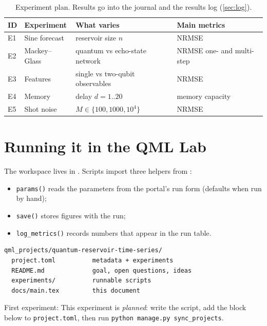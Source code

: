 \documentclass[11pt,a4paper]{article}
\begin{document}
\begin{table}[h]
\centering\small
\begin{tabularx}{\linewidth}{@{}l>{\raggedright}X>{\raggedright}X>{\raggedright\arraybackslash}X@{}}
\toprule
ID & Experiment & What varies & Main metrics \\
\midrule
  E1 & Sine forecast & reservoir size $n$ & NRMSE \\
  E2 & Mackey--Glass & quantum vs echo-state network & NRMSE one- and multi-step \\
  E3 & Features & single vs two-qubit observables & NRMSE \\
  E4 & Memory & delay $d=1..20$ & memory capacity \\
  E5 & Shot noise & $M\in\{100,1000,10^4\}$ & NRMSE \\
\bottomrule
\end{tabularx}
\caption{Experiment plan. Results go into the journal and the results log (\cref{sec:log}).}
\end{table}

\section{Running it in the QML Lab}
The workspace lives in . Scripts import three helpers from
:
\begin{itemize}
  \item \texttt{params()} reads the parameters from the portal's run form (defaults when run by hand);
  \item \texttt{save()} stores figures with the run;
  \item \texttt{log\_metrics()} records numbers that appear in the run table.
\end{itemize}

\begin{lstlisting}
qml_projects/quantum-reservoir-time-series/
  project.toml          metadata + experiments
  README.md             goal, open questions, ideas
  experiments/          runnable scripts
  docs/main.tex         this document
\end{lstlisting}

First experiment: This experiment is \emph{planned}: write the script, add the block below to \texttt{project.toml}, then run \texttt{python manage.py sync\_projects}.
\end{document}
